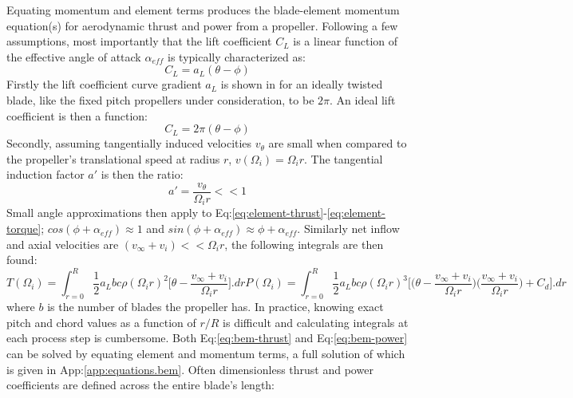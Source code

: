 Equating momentum and element terms produces the blade-element momentum equation(s) for aerodynamic thrust and power from a propeller. Following a few assumptions, most importantly that the lift coefficient $C_L$ is a linear function of the effective angle of attack $\alpha_{eff}$ is typically characterized as:
\begin{equation}
C_L=a_L(\theta-\phi)
\end{equation}
Firstly the lift coefficient curve gradient $a_L$ is shown in \cite{aerodynamicsforengineering} for an ideally twisted blade, like the fixed pitch propellers under consideration, to be $2\pi$. An ideal lift coefficient is then a function:
\begin{equation}\label{eq:lift-curve-gradient}
C_L=2\pi(\theta-\phi)
\end{equation}
Secondly, assuming tangentially induced velocities $v_\theta$ are small when compared to the propeller's translational speed at radius $r$, $v(\Omega_i)=\Omega_i r$. The tangential induction factor $a'$ is then the ratio:
\begin{equation}
a'=\frac{v_\theta}{\Omega_i r}<<1
\end{equation}
Small angle approximations then apply to Eq:\ref{eq:element-thrust}-\ref{eq:element-torque}; $cos(\phi+\alpha_{eff})\approx 1$ and $sin(\phi+\alpha_{eff})\approx \phi+\alpha_{eff}$. Similarly net inflow and axial velocities are $(v_\infty + v_i)<<\Omega_i r$, the following integrals are then found:
\begin{subequations}
\begin{equation}\label{eq:bem-thrust}
T(\Omega_i)=\int_{r=0}^R \frac{1}{2} a_L b c \rho (\Omega_i r)^2 \bigg[\theta-\frac{v_\infty+v_i}{\Omega_i r}\bigg].dr
\end{equation}
\begin{equation}\label{eq:bem-power}
P(\Omega_i)=\int_{r=0}^R \frac{1}{2}a_L b c \rho (\Omega_i r)^3\bigg[\big(\theta-\frac{v_\infty+v_i}{\Omega_i r}\big)\big(\frac{v_\infty+v_i}{\Omega_i r}\big) + C_d\bigg].dr
\end{equation}
\end{subequations}
where $b$ is the number of blades the propeller has. In practice, knowing exact pitch and chord values as a function of $r/R$ is difficult and calculating integrals at each process step is cumbersome. Both Eq:\ref{eq:bem-thrust} and Eq:\ref{eq:bem-power} can be solved by equating element and momentum terms, a full solution of which is given in App:\ref{app:equations.bem}. Often dimensionless thrust and power coefficients are defined across the entire blade's length:
